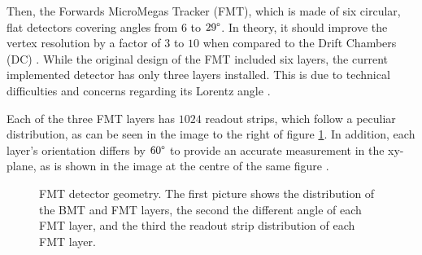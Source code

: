     Then, the Forwards MicroMegas Tracker (FMT), which is made of six circular, flat detectors covering angles from $6$ to $29\degree$.
    In theory, it should improve the vertex resolution by a factor of $3$ to $10$ when compared to the Drift Chambers (DC) \cite{aune2009}.
    While the original design of the FMT included six layers, the current implemented detector has only three layers installed.
    This is due to technical difficulties and concerns regarding its Lorentz angle \cite{konczykowski2010}.

    Each of the three FMT layers has $1024$ readout strips, which follow a peculiar distribution, as can be seen in the image to the right of figure \ref{fig::fmt_geometry}.
    In addition, each layer's orientation differs by $60\degree$ to provide an accurate measurement in the xy-plane, as is shown in the image at the centre of the same figure \cite{acker2020mvt}.

    \begin{figure}[t]
        \centering{}
        \caption[FMT detector geometry.]{FMT detector geometry. The first picture shows the distribution of the BMT and FMT layers, the second the different angle of each FMT layer, and the third the readout strip distribution of each FMT layer.}
        \label{fig::fmt_geometry}
    \end{figure}

